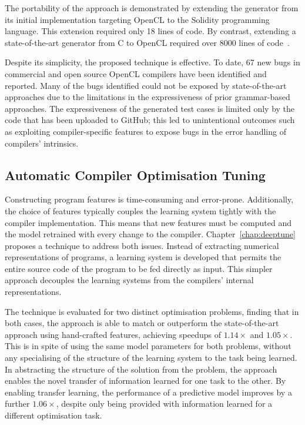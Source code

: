 The portability of the approach is demonstrated by extending the generator from its initial implementation targeting OpenCL to the Solidity programming language. This extension required only 18 lines of code. By contrast, extending a state-of-the-art generator from C to OpenCL required over 8000 lines of code~\cite{Lidbury2015a}.

Despite its simplicity, the proposed technique is effective. To date, 67 new bugs in commercial and open source OpenCL compilers have been identified and reported. Many of the bugs identified could not be exposed by state-of-the-art approaches due to the limitations in the expressiveness of prior grammar-based approaches. The expressiveness of the generated test cases is limited only by the code that has been uploaded to GitHub; this led to unintentional outcomes such as exploiting compiler-specific features to expose bugs in the error handling of compilers' intrinsics. 


\subsection{Automatic Compiler Optimisation Tuning}

 Constructing program features is time-consuming and error-prone. Additionally, the choice of features typically couples the learning system tightly with the compiler implementation. This means that new features must be computed and the model retrained with every change to the compiler. Chapter~\ref{chap:deeptune} proposes a technique to address both issues. Instead of extracting numerical representations of programs, a learning system is developed that permits the entire source code of the program to be fed directly as input. This simpler approach decouples the learning systems from the compilers' internal representations.

The technique is evaluated for two distinct optimisation problems, finding that in both cases, the approach is able to match or outperform the state-of-the-art approach using hand-crafted features, achieving speedups of $1.14\times$ and $1.05\times$. This is in spite of using the same model parameters for both problems, without any specialising of the structure of the learning system to the task being learned. In abstracting the structure of the solution from the problem, the approach enables the novel transfer of information learned for one task to the other. By enabling transfer learning, the performance of a predictive model improves by a further $1.06\times$, despite only being provided with information learned for a different optimisation task.

